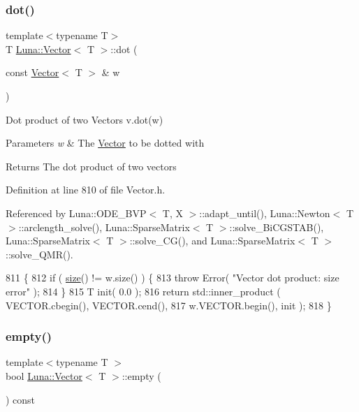 \subsubsection{\texorpdfstring{dot()}{dot()}}
{\footnotesize\ttfamily template$<$typename T$>$ \\
T \hyperlink{classLuna_1_1Vector}{Luna\+::\+Vector}$<$ T $>$\+::dot (\begin{DoxyParamCaption}\item[{const \hyperlink{classLuna_1_1Vector}{Vector}$<$ T $>$ \&}]{w }\end{DoxyParamCaption})\hspace{0.3cm}{\ttfamily [inline]}}



Dot product of two Vectors v.\+dot(w) 


\begin{DoxyParams}{Parameters}
{\em w} & The \hyperlink{classLuna_1_1Vector}{Vector} to be dotted with \\
\hline
\end{DoxyParams}
\begin{DoxyReturn}{Returns}
The dot product of two vectors 
\end{DoxyReturn}


Definition at line 810 of file Vector.\+h.



Referenced by Luna\+::\+O\+D\+E\+\_\+\+B\+V\+P$<$ T, X $>$\+::adapt\+\_\+until(), Luna\+::\+Newton$<$ T $>$\+::arclength\+\_\+solve(), Luna\+::\+Sparse\+Matrix$<$ T $>$\+::solve\+\_\+\+Bi\+C\+G\+S\+T\+A\+B(), Luna\+::\+Sparse\+Matrix$<$ T $>$\+::solve\+\_\+\+C\+G(), and Luna\+::\+Sparse\+Matrix$<$ T $>$\+::solve\+\_\+\+Q\+M\+R().


\begin{DoxyCode}
811   \{
812     \textcolor{keywordflow}{if} ( \hyperlink{classLuna_1_1Vector_ac9b6ed7a0df401728f27c193fbc8f4d8}{size}() != w.size() )   \{
813       \textcolor{keywordflow}{throw} Error( \textcolor{stringliteral}{"Vector dot product: size error"} );
814     \}
815     T init( 0.0 );
816     \textcolor{keywordflow}{return} std::inner\_product ( VECTOR.cbegin(), VECTOR.cend(),
817                      w.VECTOR.begin(), init );
818   \}
\end{DoxyCode}
\mbox{\label{classLuna_1_1Vector_afdb918d5b0eb66b94f8f9201b8bb7e45}} 
\subsubsection{\texorpdfstring{empty()}{empty()}}
{\footnotesize\ttfamily template$<$typename T $>$ \\
bool \hyperlink{classLuna_1_1Vector}{Luna\+::\+Vector}$<$ T $>$\+::empty (\begin{DoxyParamCaption}{ }\end{DoxyParamCaption}) const\hspace{0.3cm}{\ttfamily [inline]}}



